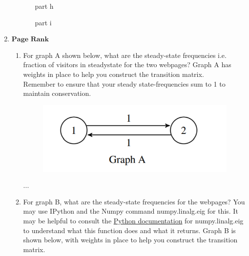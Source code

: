 \documentclass[11pt]{article}
\begin{document}
\begin{enumerate}
\begin{enumerate}
\begin{enumerate}[(a)]
	      		      		
	      	\newpage
	      	\begin{Answer}
	      		part h
	      	\end{Answer}
	      		      	    
	      	\newpage
	      	\begin{Answer}
	      		part i
	      	\end{Answer}
	      		      	    
	      \end{enumerate}
	      
	      	      	
	      	      	
\end{enumerate}
	      			      		   
	      		
	      			      		   
\newpage
\item $\textbf{Page Rank}$
	      		
\begin{enumerate}
	\item For graph A shown below, what are the steady-state frequencies i.e. fraction of visitors in steadystate for the two webpages? Graph A has weights in place to help you construct the transition matrix.\\Remember to ensure that your steady state-frequencies sum to 1 to maintain conservation. 
	      \begin{figure}[h]
	      	\centering
	      	\includegraphics[scale=0.9]{q9a}
	      \end{figure}
	      \begin{Answer}
	      	...
	      \end{Answer}
	      
	      
	      \newpage
	\item For graph B, what are the steady-state frequencies for the webpages? You may use IPython and the Numpy command numpy.linalg.eig for this. It may be helpful to consult the \href{https://numpy.org/doc/stable/reference/generated/numpy.linalg.eig.html}{Python documentation} for numpy.linalg.eig to understand what this function does and what it returns. Graph B is shown below, with weights in place to help you construct the transition matrix.
	      	      			

\end{enumerate}
\end{enumerate}
\end{document}
